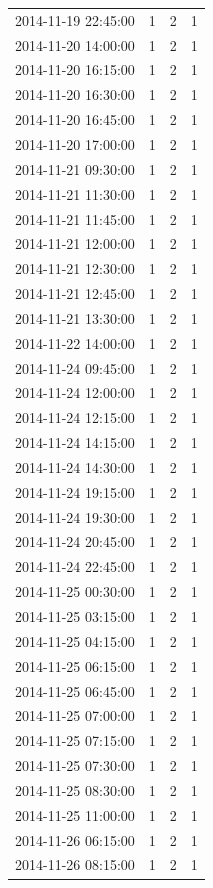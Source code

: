 \begin{tabular}{lrrr}
2014-11-19 22:45:00 & 1 & 2 & 1 \\
2014-11-20 14:00:00 & 1 & 2 & 1 \\
2014-11-20 16:15:00 & 1 & 2 & 1 \\
2014-11-20 16:30:00 & 1 & 2 & 1 \\
2014-11-20 16:45:00 & 1 & 2 & 1 \\
2014-11-20 17:00:00 & 1 & 2 & 1 \\
2014-11-21 09:30:00 & 1 & 2 & 1 \\
2014-11-21 11:30:00 & 1 & 2 & 1 \\
2014-11-21 11:45:00 & 1 & 2 & 1 \\
2014-11-21 12:00:00 & 1 & 2 & 1 \\
2014-11-21 12:30:00 & 1 & 2 & 1 \\
2014-11-21 12:45:00 & 1 & 2 & 1 \\
2014-11-21 13:30:00 & 1 & 2 & 1 \\
2014-11-22 14:00:00 & 1 & 2 & 1 \\
2014-11-24 09:45:00 & 1 & 2 & 1 \\
2014-11-24 12:00:00 & 1 & 2 & 1 \\
2014-11-24 12:15:00 & 1 & 2 & 1 \\
2014-11-24 14:15:00 & 1 & 2 & 1 \\
2014-11-24 14:30:00 & 1 & 2 & 1 \\
2014-11-24 19:15:00 & 1 & 2 & 1 \\
2014-11-24 19:30:00 & 1 & 2 & 1 \\
2014-11-24 20:45:00 & 1 & 2 & 1 \\
2014-11-24 22:45:00 & 1 & 2 & 1 \\
2014-11-25 00:30:00 & 1 & 2 & 1 \\
2014-11-25 03:15:00 & 1 & 2 & 1 \\
2014-11-25 04:15:00 & 1 & 2 & 1 \\
2014-11-25 06:15:00 & 1 & 2 & 1 \\
2014-11-25 06:45:00 & 1 & 2 & 1 \\
2014-11-25 07:00:00 & 1 & 2 & 1 \\
2014-11-25 07:15:00 & 1 & 2 & 1 \\
2014-11-25 07:30:00 & 1 & 2 & 1 \\
2014-11-25 08:30:00 & 1 & 2 & 1 \\
2014-11-25 11:00:00 & 1 & 2 & 1 \\
2014-11-26 06:15:00 & 1 & 2 & 1 \\
2014-11-26 08:15:00 & 1 & 2 & 1 \\

\end{tabular}
